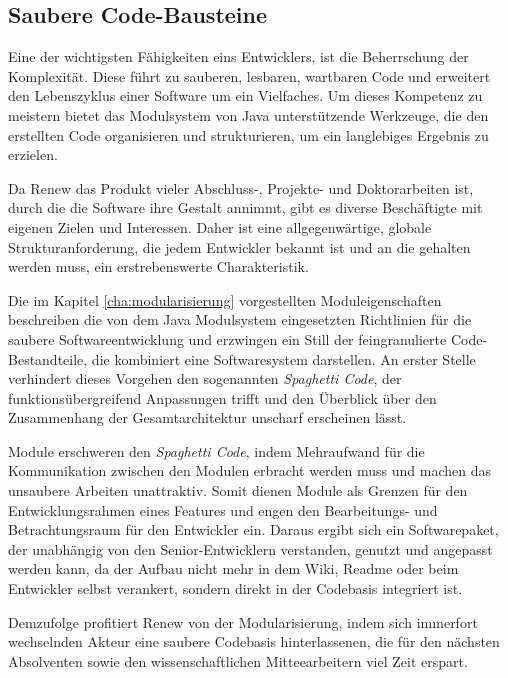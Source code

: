 \subsection{Saubere Code-Bausteine}\label{sub:scbs}

Eine der wichtigsten Fähigkeiten eins Entwicklers, ist die Beherrschung der Komplexität. Diese führt zu sauberen, lesbaren, wartbaren Code und erweitert den Lebenszyklus einer Software um ein Vielfaches. Um dieses Kompetenz zu meistern bietet das Modulsystem von Java unterstützende Werkzeuge, die den erstellten Code organisieren und strukturieren, um ein langlebiges Ergebnis zu erzielen. 


Da Renew das Produkt vieler Abschluss-, Projekte- und Doktorarbeiten ist, durch die die Software ihre Gestalt annimmt, gibt es diverse Beschäftigte mit eigenen Zielen und Interessen. Daher ist eine allgegenwärtige, globale Strukturanforderung, die jedem Entwickler bekannt ist und an die gehalten werden muss, ein erstrebenswerte Charakteristik. 


Die im Kapitel \ref{cha:modularisierung} vorgestellten Moduleigenschaften beschreiben die von dem Java Modulsystem eingesetzten Richtlinien für die saubere Softwareentwicklung und erzwingen ein Still der feingranulierte Code-Bestandteile, die kombiniert eine Softwaresystem darstellen. An erster Stelle verhindert dieses Vorgehen den sogenannten \textit{Spaghetti Code}, der funktionsübergreifend Anpassungen trifft und den Überblick über den Zusammenhang der Gesamtarchitektur unscharf erscheinen lässt. 


Module erschweren den \textit{Spaghetti Code}, indem Mehraufwand für die Kommunikation zwischen den Modulen erbracht werden muss und machen das unsaubere Arbeiten unattraktiv. Somit dienen Module als Grenzen für den Entwicklungsrahmen eines Features und engen den Bearbeitungs- und Betrachtungsraum für den Entwickler ein. Daraus ergibt sich ein Softwarepaket, der unabhängig von den Senior-Entwicklern verstanden, genutzt und angepasst werden kann, da der Aufbau nicht mehr in dem Wiki, Readme oder beim Entwickler selbst verankert, sondern direkt in der Codebasis integriert ist. 


Demzufolge profitiert Renew von der Modularisierung, indem sich immerfort wechselnden Akteur eine saubere Codebasis hinterlassenen, die für den nächsten Absolventen sowie den wissenschaftlichen Mitteearbeitern viel Zeit erspart. \bigbreak


